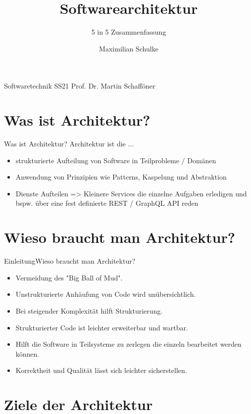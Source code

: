 \documentclass{beamer}
\title{Softwarearchitektur}
\subtitle{5 in 5 Zusammenfassung}
\author{Maximilian Schulke}
\begin{document}
\begin{frame}
	Softwaretechnik \hfill SS21
	\titlepage
	Prof. Dr. Martin Schafföner
\end{frame}

\section{Was ist Architektur?}

\begin{frame}{Was ist Architektur?}
	Architektur ist die ...
	\begin{itemize}
		\item{strukturierte Aufteilung von Software in Teilprobleme / Domänen}
		\item{Anwendung von Prinzipien wie Patterns, Kaspelung und
			Abstraktion}
		\item{
			Dienste Aufteilen => Kleinere Services die einzelne Aufgaben
			erledigen und bspw. über eine fest definierte REST / GraphQL API
			reden}
	\end{itemize}
\end{frame}

\section{Wieso braucht man Architektur?}

\begin{frame}{Einleitung}{Wieso braucht man Architektur?}

	\begin{itemize}
		\item Vermeidung des "Big Ball of Mud".
		\item Unstrukturierte Anhäufung von Code wird unübersichtlich.
		\item Bei steigender Komplexität hilft Strukturierung.
		\item Strukturierter Code ist leichter erweiterbar und wartbar.
		\item Hilft die Software in Teilsysteme zu zerlegen die einzeln bearbeitet werden können.
		\item Korrektheit und Qualität lässt sich leichter sicherstellen.
	\end{itemize}
\end{frame}

\section{Ziele der Architektur}
\end{document}
